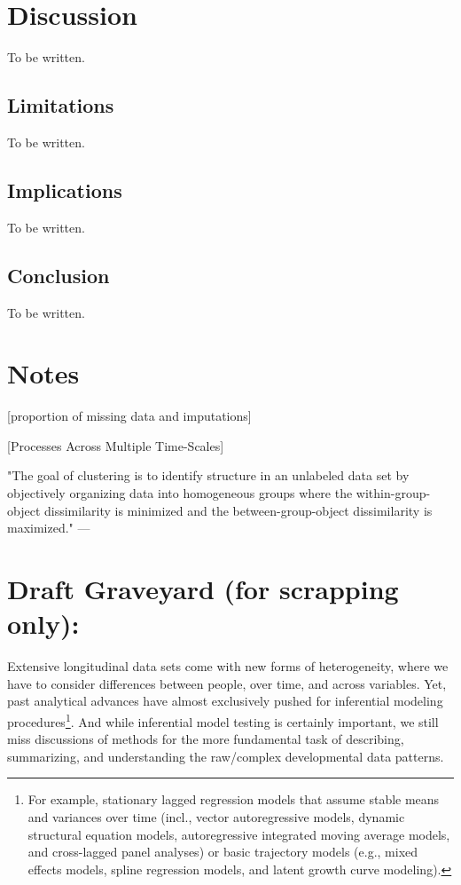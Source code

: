 \documentclass[man, 12pt, a4paper]{apa7}
\theoremstyle{break}
\theoremstyle{plain}
\begin{document}
\section{Discussion}
To be written.

\subsection{Limitations}
To be written.

\subsection{Implications}
To be written.


\subsection{Conclusion}
To be written.




\section{Notes}

\citep[][]{Madley-Dowd2019} [proportion of missing data and imputations]

\citep[e.g., see][]{Ram2014} [Processes Across Multiple Time-Scales]

"The goal of clustering is to identify structure in an unlabeled data set by objectively organizing data into homogeneous groups where the within-group-object dissimilarity is minimized and the between-group-object dissimilarity is maximized." --- \citep[][p.1857]{liao2005}

\section{Draft Graveyard (for scrapping only):}

Extensive longitudinal data sets come with new forms of heterogeneity, where we have to consider differences between people, over time, and across variables. Yet, past analytical advances have almost exclusively pushed for inferential modeling procedures\footnote{For example, stationary lagged regression models that assume stable means and variances over time (incl., vector autoregressive models, dynamic structural equation models, autoregressive integrated moving average models, and cross-lagged panel analyses) or basic trajectory models (e.g., mixed effects models, spline regression models, and latent growth curve modeling).}. And while inferential model testing is certainly important, we still miss discussions of methods for the more fundamental task of describing, summarizing, and understanding the raw/complex developmental data patterns.
\end{document}
